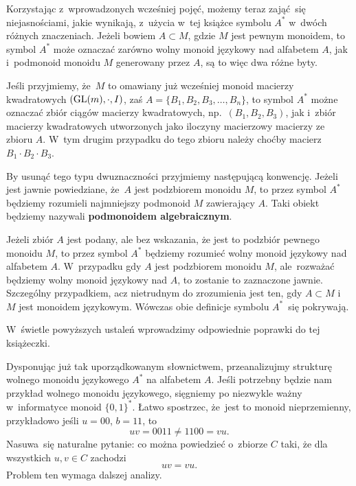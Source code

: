 \documentclass[a4paper,11pt]{article}
\begin{document}
\vspace{\spaceFour}





\start {} Korzystając z~wprowadzonych wcześniej pojęć, możemy
teraz zająć~się niejasnościami, jakie wynikają, z~użycia w~tej książce
symbolu $A^{ * }$ w~dwóch różnych znaczeniach. Jeżeli bowiem
$A \subset M$, gdzie $M$ jest pewnym monoidem, to symbol $A^{ * }$
może oznaczać zarówno wolny monoid językowy nad alfabetem $A$, jak
i~podmonoid monoidu $M$ generowany przez $A$, są to więc dwa różne
byty.

Jeśli przyjmiemy, że~$M$ to omawiany już wcześniej monoid macierzy
kwadratowych $( \mathrm{GL}( m ), \cdot, I )$, zaś
$A = \{ B_{ 1 }, B_{ 2 }, B_{ 3 }, \ldots, B_{ n } \}$, to symbol
$A^{ * }$ możne oznaczać zbiór ciągów macierzy kwadratowych,
np.~$( B_{ 1 }, B_{ 2 }, B_{ 3 } )$, jak i~zbiór macierzy kwadratowych
utworzonych jako iloczyny macierzowy macierzy ze zbioru $A$. W~tym
drugim przypadku do tego zbioru należy choćby macierz
$B_{ 1 } \cdot B_{ 2 } \cdot B_{ 3 }$.

By usunąć tego typu dwuznaczności przyjmiemy następującą konwencję.
Jeżeli jest jawnie powiedziane, że~$A$ jest podzbiorem monoidu $M$, to
przez symbol $A^{ * }$ będziemy rozumieli najmniejszy podmonoid $M$
zawierający $A$. Taki obiekt będziemy nazywali \textbf{podmonoidem
  algebraicznym}.

Jeżeli zbiór $A$ jest podany, ale bez wskazania, że
jest to podzbiór pewnego monoidu $M$, to przez symbol $A^{ * }$
będziemy rozumieć wolny monoid językowy nad alfabetem $A$. W~przypadku
gdy $A$ jest podzbiorem monoidu $M$, ale~rozważać będziemy wolny
monoid językowy nad $A$, to zostanie to zaznaczone jawnie. Szczególny
przypadkiem, acz nietrudnym do zrozumienia jest ten, gdy $A \subset M$
i~$M$ jest monoidem językowym. Wówczas obie definicje symbolu
$A^{ * }$~się pokrywają.

W~świetle powyższych ustaleń wprowadzimy odpowiednie poprawki do tej
książeczki.

\vspace{\spaceFour}





\start {} Dysponując już tak uporządkowanym słownictwem,
przeanalizujmy strukturę wolnego monoidu językowego $A^{ * }$ na
alfabetem $A$. Jeśli potrzebny będzie nam przykład wolnego monoidu
językowego, sięgniemy po niezwykle ważny w~informatyce monoid
$\{ 0, 1 \}^{ * }$. Łatwo spostrzec, że~jest to monoid nieprzemienny,
przykładowo jeśli $u = 00$, $b = 11$, to
\begin{equation}
  \label{eq:Forys-Forys-05}
  u v = 0011 \neq 1100 = vu.
\end{equation}
Nasuwa~się naturalne pytanie: co można powiedzieć o~zbiorze $C$ taki,
że dla wszystkich $u, v \in C$ zachodzi
\begin{equation}
  \label{eq:Forys-Forys-06}
  uv = vu.
\end{equation}
Problem ten wymaga dalszej analizy.
\end{document}
